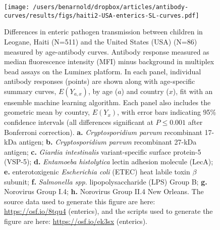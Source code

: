 \documentclass[11pt]{article}
\begin{document}
\begin{landscape}
\begin{figure}[htbp]
\begin{center}
\texttt{[image: /users/benarnold/dropbox/articles/antibody-curves/results/figs/haiti2-USA-enterics-SL-curves.pdf]}
\begin{minipage}{1.3\textwidth}
\caption{Differences in enteric pathogen transmission between children in Leogane, Haiti (N=511) and the United States (USA) (N=86) measured by age-antibody curves. Antibody response measured as median fluorescence intensity (MFI) minus background in multiplex bead assays on the Luminex platform. In each panel, individual antibody responses (points) are shown along with age-specific summary curves, $E(Y_{a,x})$, by age ($a$) and country ($x$), fit with an ensemble machine learning algorithm. Each panel also includes the geometric mean by country, $E(Y_{x})$, with error bars indicating 95\% confidence intervals (all differences significant at $P\leq0.001$ after Bonferroni correction).
\textbf{a.} \textit{Cryptosporidium parvum} recombinant 17-kDa antigen;
\textbf{b.} \textit{Cryptosporidium parvum} recombinant 27-kDa antigen;
\textbf{c.} \textit{Giardia intestinalis} variant-specific surface protein-5 (VSP-5);
\textbf{d.} \textit{Entamoeba histolytica} lectin adhesion molecule (LecA);
\textbf{e.} enterotoxigenic \textit{Escherichia coli} (ETEC) heat labile toxin $\beta$ subunit;
\textbf{f.} \textit{Salmonella spp.} lipopolysaccharide (LPS) Group B;
\textbf{g.} Norovirus Group I.4;
\textbf{h.} Norovirus Group II.4 New Orleans.
The source data used to generate this figure are here: \url{https://osf.io/8tqu4} (enterics), and the scripts used to generate the figure are here: \url{https://osf.io/ek3sx} (enterics). 
}
\label{fig:enterics}
\end{minipage}
\end{center}
\end{figure}
\end{landscape}
\end{document}

